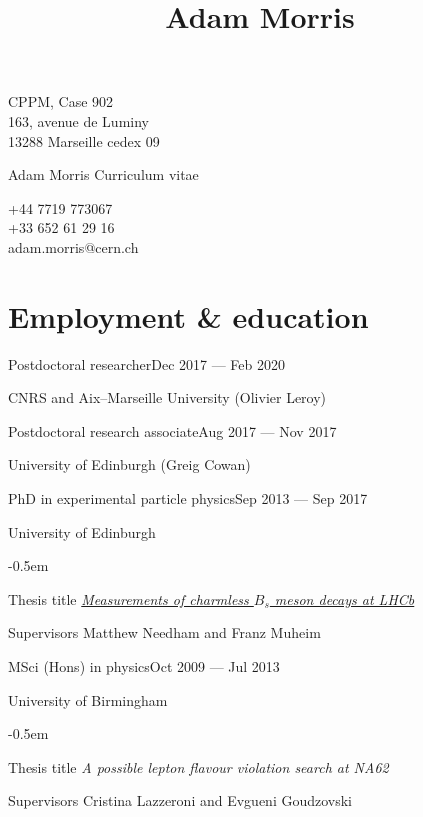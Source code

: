 \documentclass[contbibnum,titleabove]{simplecv}
\title{Adam Morris}
\newcommand\dateditem[2]{\vspace{0.5em}#1\hfill#2\par}
\newcommand\topictitle[3]{\par\dateditem{#1}{#3}{\color{darkgray}#2}}
\begin{document}
	\fontfamily{\typeface}\selectfont
	\noindent\begin{minipage}{0.33\textwidth}
	CPPM, Case 902\\163, avenue de Luminy\\13288 Marseille cedex 09
	\end{minipage}
	\noindent\begin{minipage}{0.33\textwidth}
	\centering
	{\Huge Adam Morris}
	{\large Curriculum vitae}
	\end{minipage}
	\noindent\begin{minipage}{0.33\textwidth}
	\raggedleft
	+44 7719 773067\\+33 652 61 29 16\\{adam.morris@cern.ch}
	\end{minipage}
	\section{Employment \& education}
	\topictitle{Postdoctoral researcher}{CNRS and Aix--Marseille University (Olivier Leroy)}{Dec 2017 --- Feb 2020}
	\topictitle{Postdoctoral research associate}{University of Edinburgh (Greig Cowan)}{Aug 2017 --- Nov 2017}
	\topictitle{PhD in experimental particle physics}{University of Edinburgh}{Sep 2013 --- Sep 2017}
	\begin{topic}
	\itemsep-0.5em
		\item[Thesis title]{\href{https://cds.cern.ch/record/2293045}{\textit{Measurements of charmless $B_s$ meson decays at LHCb}}}
		\item[Supervisors]{Matthew Needham and Franz Muheim}
	\end{topic}
	\topictitle{MSci (Hons) in physics}{University of Birmingham}{Oct 2009 --- Jul 2013}
	\begin{topic}
		\itemsep-0.5em
		\item[Thesis title]{\textit{A possible lepton flavour violation search at NA62}}
		\item[Supervisors]{Cristina Lazzeroni and Evgueni Goudzovski}
	\end{topic}
\end{document}

